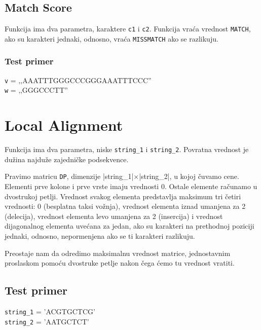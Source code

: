 \subsection{Match Score}
\label{matchScore}

Funkcija ima dva parametra, karaktere \texttt{c1} i \texttt{c2}. Funkcija vraća vrednost \texttt{MATCH}, ako su karakteri jednaki, odnosno, vraća \texttt{MISSMATCH} ako se razlikuju.




\subsubsection{Test primer}

\noindent\texttt{v} = ‚‚AAATTTGGGCCCGGGAAATTTCCC''
\\\texttt{w} = ‚‚GGGCCCTT''

\section{Local Alignment}

Funkcija ima dva parametra, niske \texttt{string\_1} i \texttt{string\_2}. Povratna vrednost je dužina najduže zajedničke podsekvence.

Pravimo matricu \texttt{DP}, dimenzije |string\_1|$\times$|string\_2|, u kojoj čuvamo cene. Elementi prve kolone i prve vrste imaju vrednosti 0. Ostale elemente računamo u dvostrukoj petlji. Vrednost svakog elementa predstavlja maksimum tri četiri vrednosti: 0 (besplatna taksi vožnja), vrednost elementa iznad umanjena za 2 (delecija), vrednost elementa levo umanjena za 2 (insercija) i vrednost dijagonalnog elementa uvećana za jedan, ako su karakteri na prethodnoj poziciji jednaki, odnosno, nepormenjena ako se ti karakteri razlikuju.

Preostaje nam da odredimo maksimalnu vrednost matrice, jednostavnim proslaskom pomoću dvostruke petlje nakon čega ćemo tu vrednost vratiti.



\subsection{Test primer}

\noindent\texttt{string\_1} = 'ACGTGCTCG'
\\\texttt{string\_2} = 'AATGCTCT'

